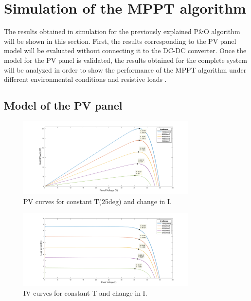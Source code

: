 
\section{Simulation of the MPPT algorithm} \label{MPPTSimulation}

The results obtained in simulation for the previously explained P\&O algorithm will be shown in this section. First, the results corresponding to the PV panel model will be evaluated without connecting it to the DC-DC converter. Once the model for the PV panel is validated, the results obtained for the complete system will be analyzed in order to show the performance of the MPPT algorithm under different environmental conditions and resistive loads .  

\subsection{Model of the PV panel}

\begin{figure}[H]
	\begin{center}
		\includegraphics[width=0.8\textwidth]{../Pictures/PV_curves_T25degrees}
		\caption{PV curves for constant T(25deg) and change in I.}
		\label{fig:PVcurves_T25} 
	\end{center}	
\end{figure}

\begin{figure}[H]
	\begin{center}
		\includegraphics[width=0.8\textwidth]{../Pictures/IV_curves_T25degrees}
		\caption{IV curves for constant T and change in I.}
		\label{fig:IVcurves_T25} 
	\end{center}	
\end{figure}


